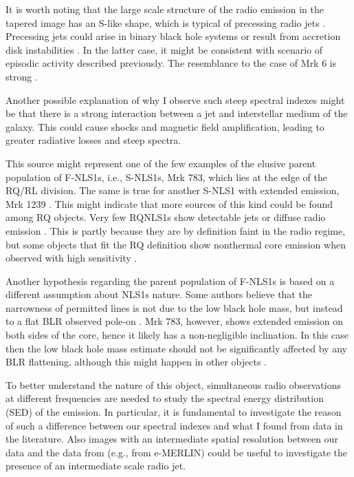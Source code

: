 \documentclass[../main.tex]{subfiles}
\begin{document}
It is worth noting that the large scale structure of the radio emission in the tapered image has an S-like shape, which is typical of precessing radio jets \citep{Ekers78,Parma85}.
Precessing jets could arise in binary black hole systems \citep[e.g.,][]{Roos93,Romero00,Rubinur17} or result from accretion disk instabilities \citep{Pringle96,Livio97}.
In the latter case, it might be consistent with scenario of episodic activity described previously. 
The resemblance to the case of Mrk 6 is strong \citep{Kharb06}.  

Another possible explanation of why I observe such steep spectral indexes might be that there is a strong interaction between a jet and interstellar medium of the galaxy.
This could cause shocks and magnetic field amplification, leading to greater radiative losses and steep spectra.

This source might represent one of the few examples of the elusive parent population of F-NLS1s, i.e., S-NLS1s, 
Mrk 783, which lies at the edge of the RQ/RL division.
The same is true for another S-NLS1 with extended emission, Mrk 1239 \citep{Doi15}.
This might indicate that more sources of this kind could be found among RQ objects. 
Very few RQNLS1s show detectable jets or diffuse radio emission \citep{Berton16b}.
This is partly because they are by definition faint in the radio regime, but some objects that fit the RQ definition show nonthermal core emission when observed with high sensitivity \citep{Giroletti09}.

Another hypothesis regarding the parent population of F-NLS1s is based on a different assumption about NLS1s nature. 
Some authors believe that the narrowness of permitted lines is not due to the low black hole mass, but instead to a flat BLR observed pole-on \citep[e.g.,][]{Decarli08}. 
Mrk 783, however, shows extended emission on both sides of the core, hence it likely has a non-negligible inclination. 
In this case then the low black hole mass estimate should not be significantly affected by any BLR flattening, although this might happen in other objects \citep{Shen14}. 

To better understand the nature of this object, simultaneous radio observations at different frequencies are needed to study the spectral energy distribution (SED) of the emission.
In particular, it is fundamental to investigate the reason of such a difference between our spectral indexes and what I found from data in the literature.
Also images with an intermediate spatial resolution between our data and the data from \citet{Doi13} (e.g., from e-MERLIN) could be useful to investigate the presence of an intermediate scale radio jet.
\end{document}
